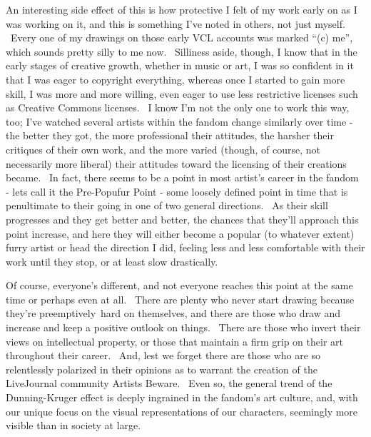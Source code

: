 An interesting side effect of this is how protective I felt of my work
early on as I was working on it, and this is something I've noted in
others, not just myself. ~Every one of my drawings on those early VCL
accounts was marked ``(c) me'', which sounds pretty silly to me now.
~Silliness aside, though, I know that in the early stages of creative
growth, whether in music or art, I was so confident in it that I was
eager to copyright everything, whereas once I started to gain more
skill, I was more and more willing, even eager to use less restrictive
licenses such as Creative Commons licenses. ~I know I'm not the only one
to work this way, too; I've watched several artists within the fandom
change similarly over time - the better they got, the more professional
their attitudes, the harsher their critiques of their own work, and the
more varied (though, of course, not necessarily more liberal) their
attitudes toward the licensing of their creations became. ~In fact,
there seems to be a point in most artist's career in the fandom - lets
call it the Pre-Popufur Point - some loosely defined point in time that
is penultimate to their going in one of two general directions. ~As
their skill progresses and they get better and better, the chances that
they'll approach this point increase, and here they will either become a
popular (to whatever extent) furry artist or head the direction I did,
feeling less and less comfortable with their work until they stop, or at
least slow drastically.

Of course, everyone's different, and not everyone reaches this point at
the same time or perhaps even at all. ~There are plenty who never start
drawing because they're preemptively~hard on themselves, and there are
those who draw and increase and keep a positive outlook on things.
~There are those who invert their views on intellectual property, or
those that maintain a firm grip on their art throughout their career.
~And, lest we forget there are those who are so relentlessly polarized
in their opinions as to warrant the creation of the LiveJournal
community Artists Beware. ~Even so, the general trend of the
Dunning-Kruger effect is deeply ingrained in the fandom's art culture,
and, with our unique focus on the visual representations of our
characters, seemingly more visible than in society at large.
